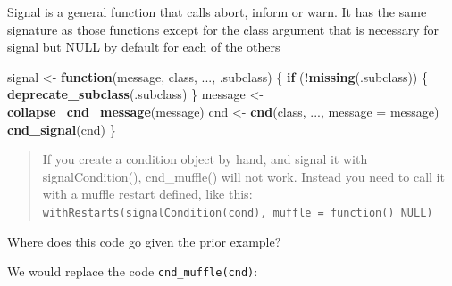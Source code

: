 \documentclass[]{book}
\newenvironment{Shaded}{\begin{snugshade}}{\end{snugshade}}
\newcommand{\CommentTok}[1]{\textcolor[rgb]{0.56,0.35,0.01}{\textit{#1}}}
\newcommand{\ControlFlowTok}[1]{\textcolor[rgb]{0.13,0.29,0.53}{\textbf{#1}}}
\newcommand{\DataTypeTok}[1]{\textcolor[rgb]{0.13,0.29,0.53}{#1}}
\newcommand{\KeywordTok}[1]{\textcolor[rgb]{0.13,0.29,0.53}{\textbf{#1}}}
\newcommand{\NormalTok}[1]{#1}
\newcommand{\OperatorTok}[1]{\textcolor[rgb]{0.81,0.36,0.00}{\textbf{#1}}}
\newcommand{\OtherTok}[1]{\textcolor[rgb]{0.56,0.35,0.01}{#1}}
\newcommand{\StringTok}[1]{\textcolor[rgb]{0.31,0.60,0.02}{#1}}
\begin{document}
Signal is a general function that calls abort, inform or warn. It has the same signature as those functions except for the class argument that is necessary for signal but NULL by default for each of the others

\begin{Shaded}
\begin{Highlighting}[]
\NormalTok{signal <-}\StringTok{ }\ControlFlowTok{function}\NormalTok{(message, class, ..., .subclass) \{}
  \ControlFlowTok{if}\NormalTok{ (}\OperatorTok{!}\KeywordTok{missing}\NormalTok{(.subclass)) \{}
    \KeywordTok{deprecate_subclass}\NormalTok{(.subclass)}
\NormalTok{  \}}
\NormalTok{  message <-}\StringTok{ }\KeywordTok{collapse_cnd_message}\NormalTok{(message)}
\NormalTok{  cnd <-}\StringTok{ }\KeywordTok{cnd}\NormalTok{(class, ..., }\DataTypeTok{message =}\NormalTok{ message)}
  \KeywordTok{cnd_signal}\NormalTok{(cnd)}
\NormalTok{\}}
\end{Highlighting}
\end{Shaded}

\begin{quote}
If you create a condition object by hand, and signal it with signalCondition(), cnd\_muffle() will not work. Instead you need to call it with a muffle restart defined, like this: \texttt{withRestarts(signalCondition(cond),\ muffle\ =\ function()\ NULL)}
\end{quote}

Where does this code go given the prior example?

We would replace the code \texttt{cnd\_muffle(cnd)}:

\begin{Shaded}
\end{Shaded}
\end{document}
